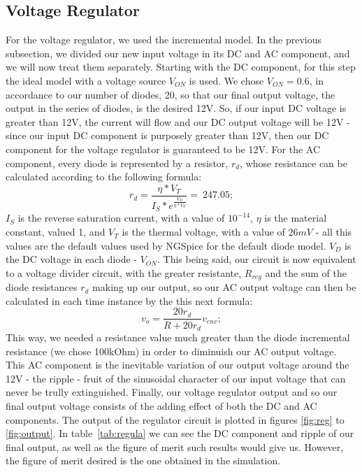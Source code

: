 \subsection{Voltage Regulator}
For the voltage regulator, we used the incremental model. In the previous subsection, we divided our new input voltage in its DC and AC component, and we will now treat them separately. Starting with the DC component, for this step the ideal model with a voltage source $V_{ON}$ is used. We chose $V_{ON} = 0.6$, in accordance to our number of diodes, 20, so that our final output voltage, the output in the series of diodes, is the desired 12V. So, if our input DC voltage is greater than 12V, the current will flow and our DC output voltage will be 12V - since our input DC component is purposely greater than 12V, then our DC component for the voltage regulator is guaranteed to be 12V.
For the AC component, every diode is represented by a resistor, $r_d$, whose resistance can be calculated according to the following formula:
\begin{equation}
r_d=\frac{\eta*V_T}{I_S*e^\frac{V_D}{\eta*V_T}}=~247.05;
\end{equation}
$I_{S}$ is the reverse saturation current, with a value of $10^{-14}$, $\eta$ is the material constant, valued 1, and $V_{T}$ is the thermal voltage, with a value of $26 mV$ - all this values are the default values used by NGSpice for the default diode model. $V_D$ is the DC voltage in each diode - $V_{ON}$. This being said, our circuit is now equivalent to a voltage divider circuit, with the greater resistante, $R_{reg}$ and the sum of the diode resistances $r_d$ making up our output, so our AC output voltage can then be calculated in each time instance by the this next formula:
\begin{equation}
v_o = \frac{20r_d}{R + 20r_d}v_{env};
\end{equation}
This way, we needed a resistance value much greater than the diode incremental resistance (we chose 100kOhm) in order to diminuish our AC output voltage. This AC component is the inevitable variation of our output voltage around the 12V - the ripple - fruit of the sinusoidal character of our input voltage that can never be trully extinguished. Finally, our voltage regulator output and so our final output voltage consists of the adding effect of both the DC and AC components. 
The output of the regulator circuit is plotted in figures \ref{fig:reg} to \ref{fig:output}. In table~\ref{tab:regula} we can see the DC component and ripple of our final output, as well as the figure of merit such results would give us. However, the figure of merit desired is the one obtained in the simulation.



